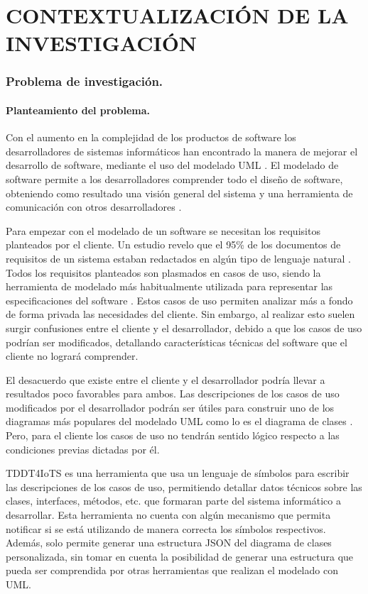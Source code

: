 \setcounter{chapter}{1}
\setcounter{section}{0}
\part{CONTEXTUALIZACIÓN DE LA INVESTIGACIÓN} 

\section{Problema de investigación.}

\subsection{Planteamiento del problema.}

Con el aumento en la complejidad de los productos de software los desarrolladores de sistemas informáticos han encontrado la manera de mejorar el desarrollo de software, mediante el uso del modelado UML \parencite{Jahan2021}. El modelado de software permite a los desarrolladores comprender todo el diseño de software, obteniendo como resultado una visión general del sistema y una herramienta de comunicación con otros desarrolladores \parencite{gonzalez2022}.

Para empezar con el modelado de un software se necesitan los requisitos planteados por el cliente. Un estudio revelo que el 95\% de los documentos de requisitos de un sistema estaban redactados en algún tipo de lenguaje natural \parencite{Jahan2021}. Todos los requisitos planteados son plasmados en casos de uso, siendo la herramienta de modelado más habitualmente utilizada para representar las especificaciones del software \parencite{hamza2021}. Estos casos de uso permiten analizar más a fondo de forma privada las necesidades del cliente. Sin embargo, al realizar esto suelen surgir confusiones entre el cliente y el desarrollador, debido a que los casos de uso podrían ser modificados, detallando características técnicas del software que el cliente no logrará comprender.

El desacuerdo que existe entre el cliente y el desarrollador podría llevar a resultados poco favorables para ambos. Las descripciones de los casos de uso modificados por el desarrollador podrán ser útiles para construir uno de los diagramas más populares del modelado UML como lo es el diagrama de clases \parencite{Abdelnabi2021}. Pero, para el cliente los casos de uso no tendrán sentido lógico respecto a las condiciones previas dictadas por él.

TDDT4IoTS es una herramienta que usa un lenguaje de símbolos para escribir las descripciones de los casos de uso, permitiendo detallar datos técnicos sobre las clases, interfaces, métodos, etc. que formaran parte del sistema informático a desarrollar. Esta herramienta no cuenta con algún mecanismo que permita notificar si se está utilizando de manera correcta los símbolos respectivos. Además, solo permite generar una estructura JSON del diagrama de clases personalizada, sin tomar en cuenta la posibilidad de generar una estructura que pueda ser comprendida por otras herramientas que realizan el modelado con UML.

